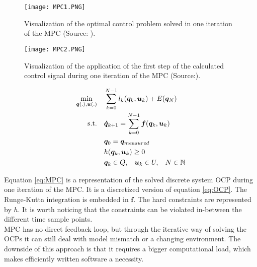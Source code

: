 \begin{figure}[h!]
	\centering
	\texttt{[image: MPC1.PNG]}
	\caption{Visualization of the optimal control problem solved in one iteration of the MPC (Source: \cite{Patrinos2019}).}
	\label{fig:MPC1}
\end{figure}

\begin{figure}[h!]
	\centering
	\texttt{[image: MPC2.PNG]}
	\caption{Visualization of the application of the first step of the calculated control signal during one iteration of the MPC (Source:\cite{Patrinos2019}).}
	\label{fig:MPC2}
\end{figure}

\newpage
\begin{equation}
\label{eq:MPC}
\begin{aligned}
\min_{\bm{q}(.),\bm{u}(.)} \quad & \sum_{k = 0}^{N-1}l_{k}(\bm{q}_{k},\bm{u}_{k}) + E(\bm{q}_{N}) \\
\textrm{s.t.} \quad & \bm{\dot{q}}_{k+1} = \sum_{k = 0}^{N-1}\bm{f}(\bm{q}_{k}, \bm{u}_{k})\\
& \bm{q}_{0}= \bm{q}_{measured}    \\
& h(\bm{q}_{k},\bm{u}_{k}) \geq 0	\\
& \bm{q}_{k}\in Q,\hspace{3 mm} \bm{u}_{k}\in U, \hspace{3 mm} N \in \mathbb{N}
\end{aligned}
\end{equation}






Equation \ref{eq:MPC} is a representation of the solved discrete system OCP during one iteration of the MPC. It is a discretized version of equation \ref{eq:OCP}. The Runge-Kutta integration is embedded in $\bm{f}$. The hard constraints are represented by $h$. It is worth noticing that the constraints can be violated in-between the different time sample points.\\

MPC has no direct feedback loop, but through the iterative way of solving the OCPs it can still deal with model mismatch or a changing environment. The downside of this approach is that it requires a bigger computational load, which makes efficiently written software a necessity. 


